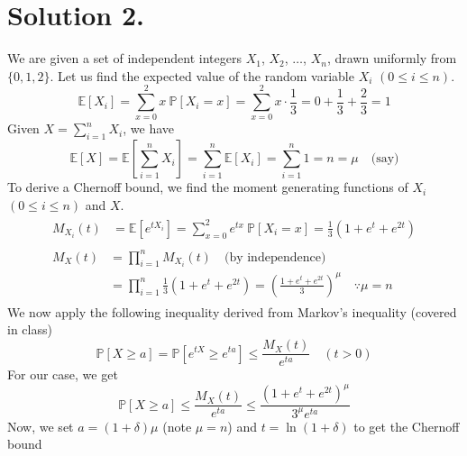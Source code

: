 \documentclass[9pt]{article}
\newcommand{\Probability}[1]{\mathbb{P}\left[ #1 \right]}
\newcommand{\Expectation}[1]{\mathbb{E}\left[ #1 \right]}
\begin{document}
\section*{\textbf{Solution 2.}}
We are given a set of independent integers $X_{1}$, $X_{2}$, $\dots$, $X_{n}$,
drawn uniformly from $\{ 0, 1, 2 \}$. Let us find the expected value of the
random variable $X_{i}$ $(0 \leq i \leq n)$.
\begin{equation}
    \Expectation{X_{i}} = \sum_{x=0}^{2} x \ \Probability{X_{i} = x}
    = \sum_{x=0}^{2} x \cdot \frac{1}{3}
    = 0 + \frac{1}{3} + \frac{2}{3} = 1
\end{equation}
Given $X = \sum_{i=1}^{n} X_{i}$, we have
\begin{equation}
    \Expectation{X} = \Expectation{\sum_{i=1}^{n} X_{i}}
    = \sum_{i=1}^{n} \Expectation{X_{i}}
    = \sum_{i=1}^{n} 1 = n = \mu \quad \text{(say)}
\end{equation}
To derive a Chernoff bound, we find the moment generating functions of
$X_{i}$ $(0 \leq i \leq n)$ and $X$.
\begin{align}
    \begin{split}
        M_{X_{i}}(t) &= \Expectation{e^{tX_{i}}}
        = \sum_{x=0}^{2} e^{tx} \ \Probability{X_{i} = x}
        = \frac{1}{3} \left( 1 + e^{t} + e^{2t} \right)
    \end{split} \\
    \begin{split}
        M_{X}(t) &= \prod_{i=1}^{n} M_{X_{i}}(t) \quad \text{(by independence)} \\
        &= \prod_{i=1}^{n} \frac{1}{3} \left( 1 + e^{t} + e^{2t} \right)
        = \left( \frac{1 + e^{t} + e^{2t}}{3} \right)^{\mu} \quad \because \mu = n
    \end{split}
\end{align}
We now apply the following inequality derived from Markov's inequality (covered in class)
\begin{equation}
    \Probability{X \geq a} = \Probability{e^{tX} \geq e^{ta}} \leq \frac{M_{X}(t)}{e^{ta}} \quad (t > 0)
\end{equation}
For our case, we get
\begin{equation}
    \Probability{X \geq a} \leq \frac{M_{X}(t)}{e^{ta}}
    \leq \frac{\left( 1 + e^{t} + e^{2t} \right)^{\mu}}{3^{\mu} e^{ta}}
\end{equation}
Now, we set $a = (1 + \delta) \mu$ (note $\mu = n$) and $t = \ln{(1 + \delta)}$
to get the Chernoff bound
\end{document}
